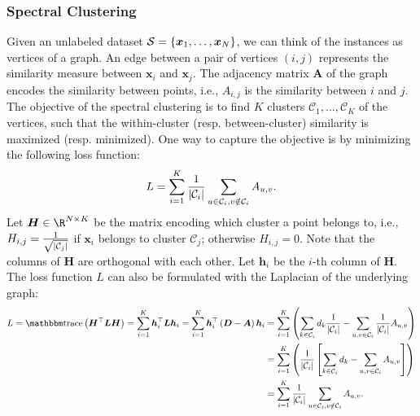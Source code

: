     \subsubsection{Spectral Clustering}
        Given an unlabeled dataset $\mathcal{S}=\{ \bm{x}_1, \ldots, \bm{x}_N \}$, we can think of the \ndata instances as \ndata vertices of a graph.
        An edge between a pair of vertices $(i, j)$ represents the similarity measure between $\bm{x}_i$ and $\bm{x}_j$.
        The adjacency matrix $\bm{A}$ of the graph encodes the similarity between points, i.e., $A_{i,j}$ is the similarity between $i$ and $j$.
        The objective of the spectral clustering is to find $K$ clusters $\mathcal{C}_1, \ldots, \mathcal{C}_K$ of the vertices, such that the within-cluster (resp. between-cluster) similarity is maximized (resp. minimized).
        One way to capture the objective is by minimizing the following loss function:
            \begin{equation}
                L = \sum_{i=1}^{K}{\frac{1}{| \mathcal{C}_i |} \sum_{u \in \mathcal{C}_i, v \notin \mathcal{C}_i}^{}{A_{u, v}}}.
            \end{equation}
        Let $\bm{H} \in \R^{\ndata \times K}$ be the matrix encoding which cluster a point belongs to, i.e., $H_{i,j}=\frac{1}{\sqrt{| \mathcal{C}_j |}}$ if $\bm{x}_i$ belongs to cluster $\mathcal{C}_j$; otherwise $H_{i,j}=0$.
        Note that the columns of $\bm{H}$ are orthogonal with each other. 
        Let $\bm{h}_i$ be the $i$-th column of $\bm{H}$.
        The loss function $L$ can also be formulated with the Laplacian of the underlying graph:
            \begin{equation}
                \begin{aligned}
                    L  = \Tr\left( \bm{H}^\top \bm{L} \bm{H}  \right) = \sum_{i=1}^{K}{\bm{h}_i^\top \bm{L} \bm{h}_i} 
                      = \sum_{i=1}^{K}{\bm{h}_i^\top \left( \bm{D} - \bm{A} \right) \bm{h}_i} & = \sum_{i=1}^{K}{\left(   \sum_{k \in \mathcal{C}_i}^{}{d_k \frac{1}{\SetCard{\mathcal{C}_i}}} - \sum_{u, v \in \mathcal{C}_i}^{}{\frac{1}{\SetCard{\mathcal{C}_i}}A_{u, v}} 
                      \right)} \\
                      & =   \sum_{i=1}^{K}{\left( \frac{1}{\SetCard{\mathcal{C}_i}} \left[ \sum_{k \in \mathcal{C}_i}^{}{d_k} - \sum_{u, v \in \mathcal{C}_i}^{}{A_{u, v}} \right] \right)} \\
                      & = \sum_{i=1}^{K}{\frac{1}{\SetCard{\mathcal{C}_i}} \sum_{u \in \mathcal{C}_i, v\notin \mathcal{C}_i}^{}{A_{u,v}}}.
                \end{aligned}
            \end{equation}
